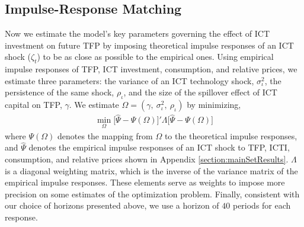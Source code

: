 \documentclass[12pt]{article}
\begin{document}
\subsection{Impulse-Response Matching}\label{section:IRmatching}

Now we estimate the model's key parameters governing the effect of ICT investment on future TFP by imposing theoretical impulse responses of an ICT shock ($\zeta_t$) to be as close as possible to the empirical ones. Using empirical impulse responses of TFP, ICT investment, consumption, and relative prices, we estimate three parameters: the variance of an ICT technology shock, $\sigma_{\iota}^2$, the persistence of the same shock, $\rho_{\iota}$, and the size of the spillover effect of ICT capital on TFP, $\gamma$. We estimate $\Omega = (\gamma, \ \sigma_{\iota}^2, \ \rho_{\iota})$ by minimizing,
\begin{eqnarray}\label{equation:min_prob_IRmatching}
\min_{\Omega} \big[  \hat{\Psi} - \Psi(\Omega)  \big]' \Lambda \big[  \hat{\Psi} - \Psi(\Omega)  \big]
\end{eqnarray}
where $\Psi(\Omega)$ denotes the mapping from $\Omega$ to the theoretical impulse responses, and $\hat{\Psi}$ denotes the empirical impulse responses of an ICT shock to TFP, ICTI, consumption, and relative prices shown in Appendix \ref{section:mainSetResults}. $\Lambda$ is a diagonal weighting matrix, which is the inverse of the variance matrix of the empirical impulse responses. These elements serve as weights to impose more precision on some estimates of the optimization problem. Finally, consistent with our choice of horizons presented above, we use a horizon of $40$ periods for each response. %
\end{document}
